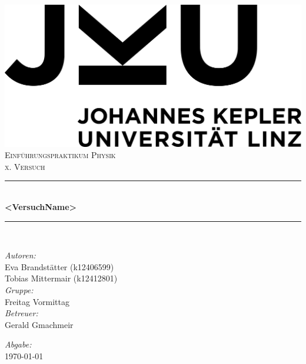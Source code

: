 \documentclass[a4paper,12pt]{article}
\begin{document}
\begin{titlepage}
    \centering
    \includegraphics[scale = 0.03]{bilder/JKU_Logo.png}\\[1.0 cm]	%
    \textsc{\Large Einführungspraktikum Physik}\\[0.5 cm]	        %
    \textsc{\large x. Versuch}\\[0.5 cm]				            %
    \rule{\linewidth}{0.4 mm} \\[0.4 cm]
    { \huge \bfseries <VersuchName>}\\                              %
    \rule{\linewidth}{0.4 mm} \\[1.5 cm]
    \begin{minipage}{0.8\textwidth}
        \begin{flushleft} \large
            \emph{Autoren:}\\
            Eva Brandstätter (k12406599)\\
            Tobias Mittermair (k12412801)\\
            \vspace{1cm}
            \emph{Gruppe:}\\
            Freitag Vormittag\\
            \vspace{1cm}
            \emph{Betreuer:}\\
            Gerald Gmachmeir
        \end{flushleft}
        \begin{flushright} \large
            \vspace{8cm}
            \emph{Abgabe:} \\
            \today
        \end{flushright}
    \end{minipage}~    
\end{titlepage}
\end{document}
